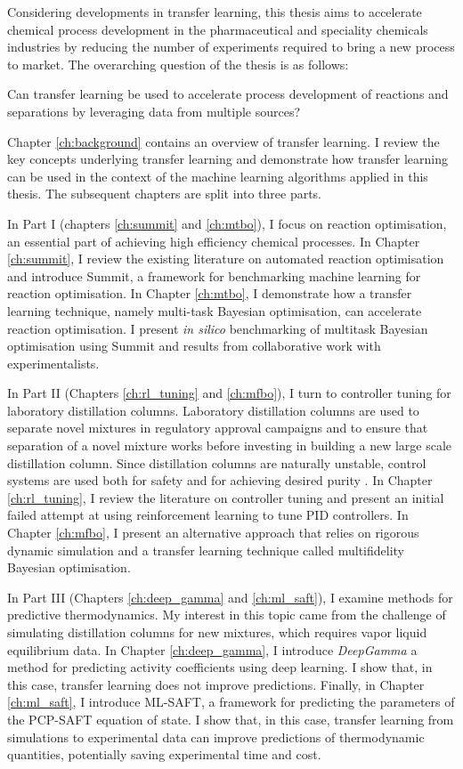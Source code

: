 Considering developments in transfer learning, this thesis aims to accelerate chemical process development in the pharmaceutical and speciality chemicals industries by reducing the number of experiments required to bring a new process to market. The overarching question of the thesis is as follows:
\begin{displayquote}
Can transfer learning be used to accelerate process development of reactions and separations by leveraging data from multiple sources? 
\end{displayquote}

Chapter \ref{ch:background} contains an overview of transfer learning. I review the key concepts underlying transfer learning and demonstrate how transfer learning can be used in the context of the machine learning algorithms applied in this thesis.  The subsequent chapters are split into three parts.

In Part I (chapters \ref{ch:summit} and \ref{ch:mtbo}), I focus on reaction optimisation, an essential part of achieving high efficiency chemical processes. In Chapter \ref{ch:summit}, I review the existing literature on automated reaction optimisation and introduce Summit, a framework for benchmarking machine learning for reaction optimisation.  In Chapter \ref{ch:mtbo}, I demonstrate how a transfer learning technique, namely multi-task Bayesian optimisation, can accelerate reaction optimisation. I present \textit{in silico} benchmarking of multitask Bayesian optimisation using Summit and results from collaborative work with experimentalists.

In Part II (Chapters \ref{ch:rl_tuning} and \ref{ch:mfbo}), I turn to controller tuning for laboratory distillation columns. Laboratory distillation columns are used to separate novel mixtures in regulatory approval campaigns and to ensure that separation of a novel mixture works before investing in building a new large scale distillation column. Since distillation columns are naturally unstable, control systems are used both for safety and for achieving desired purity \cite{Skogestad2007}. In Chapter \ref{ch:rl_tuning}, I review the literature on controller tuning and present an initial failed attempt at using reinforcement learning to tune PID controllers. In Chapter \ref{ch:mfbo}, I present an alternative approach that relies on rigorous dynamic simulation and a transfer learning technique called multifidelity Bayesian optimisation.

In Part III (Chapters \ref{ch:deep_gamma} and \ref{ch:ml_saft}), I examine methods for predictive thermodynamics. My interest in this topic came from the challenge of simulating distillation columns for new mixtures, which requires vapor liquid equilibrium data. In Chapter \ref{ch:deep_gamma}, I introduce \textit{DeepGamma} a method for predicting activity coefficients using deep learning. I show that, in this case, transfer learning does not improve predictions. Finally, in Chapter \ref{ch:ml_saft}, I introduce ML-SAFT, a framework for predicting the parameters of the PCP-SAFT equation of state. I show that, in this case, transfer learning from simulations to experimental data can improve predictions of thermodynamic quantities, potentially saving experimental time and cost.

